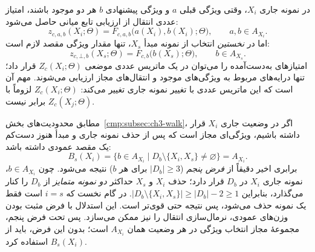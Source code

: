 در نمونه جاری $X_i$، وقتی ویژگی قبلی $a$ و ویژگی پیشنهادی $b$
هر دو موجود باشند، امتیاز عددی انتقال از ارزیابی تابع میانی حاصل می‌شود:
\begin{equation}\label{cmp:eq:ch3-parametric-feature-score}
\boxed{
z_{c,a,b}(X_i;\Theta)=
F_{c,a,b}\bigl(a(X_i),b(X_i);\Theta\bigr),
\qquad a,b\in A_{X_i}.
}
\end{equation}
اما در \emph{نخستین} انتخاب از نمونه مبدأ $X_s$، تنها مقدار ویژگی مقصد
لازم است:
\begin{equation}\label{cmp:eq:ch3-parametric-start-score}
\boxed{
z_{c,\bot,b}(X_s;\Theta)=F_{c,b}\bigl(b(X_s);\Theta\bigr),
\qquad b\in A_{X_s}.
}
\end{equation}
امتیازهای به‌دست‌آمده را می‌توان در یک ماتریس عددی موضعی
$Z_{c}(X_i;\Theta)$ قرار داد؛ تنها درایه‌های مربوط به ویژگی‌های موجود
و انتقال‌های مجاز ارزیابی می‌شوند. مهم آن است که این ماتریس عددی
با تغییر نمونه جاری تغییر می‌کند: $Z_{c}(X_i;\Theta)$ لزوماً
با $Z_{c}(X_j;\Theta)$ برابر نیست.

مطابق محدودیت‌های بخش~\ref{cmp:subsec:ch3-walk}،
اگر در وضعیت جاری $X_i$ قرار داشته باشیم،
ویژگی‌ای مجاز است که پس از حذف نمونه جاری و مبدأ
هنوز دست‌کم یک مقصد عمودی داشته باشد:
\begin{equation}\label{cmp:eq:ch3-feature-eligibility}
B_s(X_i)=\bigl\{b\in A_{X_i}\mid
D_b\setminus\{X_i,X_s\}\ne\varnothing\bigr\}
=A_{X_i}.
\end{equation}
برابری اخیر دقیقاً از \emph{فرض پنجم}
($|D_b|\ge3$ برای هر $b$) نتیجه می‌شود.
چون $b\in A_{X_i}$، نمونه جاری $X_i$ در $D_b$ قرار دارد؛
حذف $X_i$ و $X_s$ حداکثر \emph{دو نمونه متمایز}
از $D_b$ را کنار می‌گذارد، بنابراین
$\bigl|D_b\setminus\{X_i,X_s\}\bigr|
\ge |D_b|-2\ge1$.
در گام نخست که $i=s$ است فقط یک نمونه حذف می‌شود،
پس نتیجه حتی قوی‌تر است. این استدلال با فرض مثبت بودن
وزن‌های عمودی، نرمال‌سازی انتقال را نیز ممکن می‌سازد.
پس تحت فرض پنجم، مجموعهٔ مجاز انتخاب ویژگی در هر وضعیت
همان $A_{X_i}$ است؛ بدون این فرض، باید از $B_s(X_i)$ استفاده کرد.

